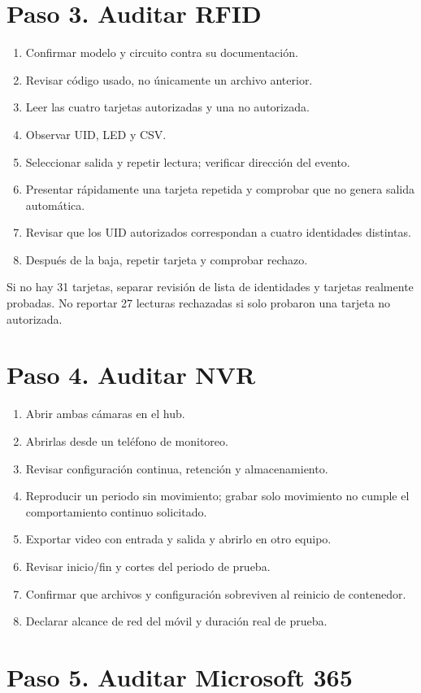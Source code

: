 \documentclass[12pt,a4paper]{article}
\begin{document}
\section*{Paso 3. Auditar RFID}
\begin{enumerate}
\item Confirmar modelo y circuito contra su documentación.
\item Revisar código usado, no únicamente un archivo anterior.
\item Leer las cuatro tarjetas autorizadas y una no autorizada.
\item Observar UID, LED y CSV.
\item Seleccionar salida y repetir lectura; verificar dirección del evento.
\item Presentar rápidamente una tarjeta repetida y comprobar que no genera salida automática.
\item Revisar que los UID autorizados correspondan a cuatro identidades distintas.
\item Después de la baja, repetir tarjeta y comprobar rechazo.
\end{enumerate}
Si no hay 31 tarjetas, separar revisión de lista de identidades y tarjetas realmente probadas. No reportar 27 lecturas rechazadas si solo probaron una tarjeta no autorizada.\par
{}\section*{Paso 4. Auditar NVR}
\begin{enumerate}
\item Abrir ambas cámaras en el hub.
\item Abrirlas desde un teléfono de monitoreo.
\item Revisar configuración continua, retención y almacenamiento.
\item Reproducir un periodo sin movimiento; grabar solo movimiento no cumple el comportamiento continuo solicitado.
\item Exportar video con entrada y salida y abrirlo en otro equipo.
\item Revisar inicio/fin y cortes del periodo de prueba.
\item Confirmar que archivos y configuración sobreviven al reinicio de contenedor.
\item Declarar alcance de red del móvil y duración real de prueba.
\end{enumerate}
\section*{Paso 5. Auditar Microsoft 365}
\end{document}
